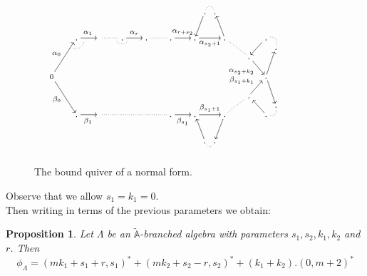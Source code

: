 \documentclass{amsart}
\theoremstyle{plain}
\newtheorem{prop}[teo]{Proposition}
\theoremstyle{definition}
\begin{document}
\begin{figure}[H]

$$\SelectTips{eu}{10}\xymatrix@C=.1pc@R=.2pc{  &&& &&& &&& &&& &&& &&& & .\ar[dddl] \ar@{.}@/^/[r]& . &\\
 &&& &&& &&& &&& &&& &&& &&&\\
 &&& &&& &&& &&& &&& &&& &&&\\
&&& .\ar[rrr]^{{\alpha}_1} & \ar@{.}@/^/[lld] & &    \ar@{.}[rrr] &&\ar@{.}@/_/[rr]& . \ar[rrr]^{{\alpha}_r} &&& . \ar@{.}[rrr] &&& . \ar[rrr]^{{\alpha}_{r+s_2}} &&&  . \ar[rrr]_{{\alpha}_{s_2+1}} &&& .\ar[uuul] \ar@{.}[rrrdd] &&&  && .\ar[ddll] \ar@{.}@/^/[dr] &&& &&&\\
&&&  &&& &&& &&& &&& &&& &&& &&& &&& . &&& &&& \\
 &&& &&& &&& &&& &&& &&& &&& &&&  . \ar[rrdd]_{{\alpha}_{s_2+k_2}}    \\
  &&&  &&& &&& &&& &&& &&& &&& &&& &&& \\
 \scriptstyle{0} \ar[rrruuuu]^{{\alpha}_0} \ar[rrrdddd]_{{\beta}_0}  &&& &&& &&& &&& &&& &&& &&&  &&& && .\ar[uuur] \ar[dddr]&&& \\
 &&&  &&& &&& &&& &&& &&& &&& &&& &&& \\
  &&&  &&& &&& &&& &&& &&& &&& &&&   \ar[rruu]^{{\beta}_{s_1+k_1}}  . &&& \\
  &&&  &&& &&& &&& &&& &&& &&&  &&& &&& .  \\
 &&& .\ar[rrr]_{{\beta}_1}  &&& \ar@{.}[rrrrrrrrr] &&&   &&&   &&& . \ar[rrr]_{{\beta}_{s_1}} &&&. \ar[rrr]^{{\beta}_{s_1+1}} &&&  . \ar[dddl] \ar@{.}[rrruu] &&& && . \ar[uull] \ar@{.}@/_/[ur]  &&& &&&\\
&&&  &&& &&& &&& &&& &&& &&&\\
&&&  &&& &&& &&& &&& &&& &&&\\
 &&&  &&& &&& &&& &&& &&& & . \ar[uuul]\ar@{.}@/_/[r]& . &\\
 &&&&&&&&&&&&&&&&&&}$$

\caption{The bound quiver of a normal form.}
\end{figure}

Observe that we allow  $s_1=k_1=0$.\\

Then writing \cite[Propositions 4.3 and 4.5]{Gub1} in terms of the previous parameters we obtain:

\begin{prop}\label{phibranched}
Let $\Lambda$ be an   $\tilde{\mathbb{A}}$-branched algebra with parameters $s_1,s_2,k_1,k_2$ and $r$. Then
$$\phi_{\Lambda}=(mk_1+s_1+r,s_1)^*+ (mk_2+s_2-r,s_2)^*+ (k_1+k_2).(0,m+2)^*$$
\end{prop}
\end{document}
